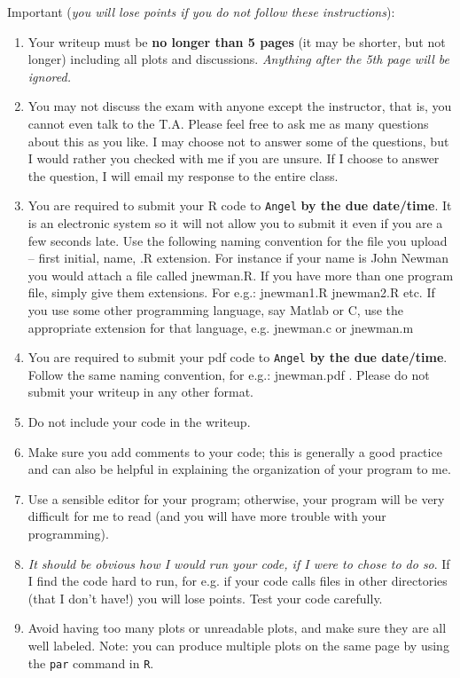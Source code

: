 \documentclass[11pt]{article}
\begin{document}
Important ({\it you will lose points if you do not follow these instructions}): 
\begin{enumerate}
\item Your writeup must be {\bf no longer than 5 pages} (it may be
  shorter, but not longer) including all plots and discussions. {\it
    Anything after the 5th page will be ignored.}
\item You may not discuss the exam with anyone except the instructor,
  that is, you cannot even talk to the T.A. Please feel free to ask me
  as many questions about this as you like. I may choose not to answer
  some of the questions, but I would rather you checked with me if you
  are unsure. If I choose to answer the question, I will email my
  response to the entire class.
\item You are required to submit your R code to {\tt Angel} {\bf by
    the due date/time}. It is an electronic system so it will not
  allow you to submit it even if you are a few seconds late.  Use the
  following naming convention for the file you upload -- first
  initial, name, .R extension. For instance if your name is John
  Newman you would attach a file called jnewman.R. If you have more
  than one program file, simply give them extensions.  For e.g.:
  jnewman1.R jnewman2.R etc.  If you use some other programming
  language, say Matlab or C, use the appropriate extension for that
  language, e.g. jnewman.c or jnewman.m
\item You are required to submit your pdf code to {\tt Angel} {\bf by
    the due date/time}. Follow the same naming convention, for e.g.:
  jnewman.pdf . Please do not submit your writeup in any other format.
\item Do not include your code in the writeup.
\item Make sure you add comments to your code; this is generally a
  good practice and can also be helpful in explaining the organization
  of your program to me.
\item Use a sensible editor for your program; otherwise, your program
  will be very difficult for me to read (and you will have more
  trouble with your programming).
\item %
  {\it It should be obvious how I would run your code, if I were to
    chose to do so}. If I find the code hard to run, for e.g. if your code
  calls files in other directories (that I don't have!) you will
  lose points. Test your code carefully.
\item Avoid having too many plots or unreadable plots, and make sure
  they are all well labeled. Note: you can produce multiple plots on
  the same page by using the {\tt par} command in {\tt R}.
\end{enumerate}
\end{document}
